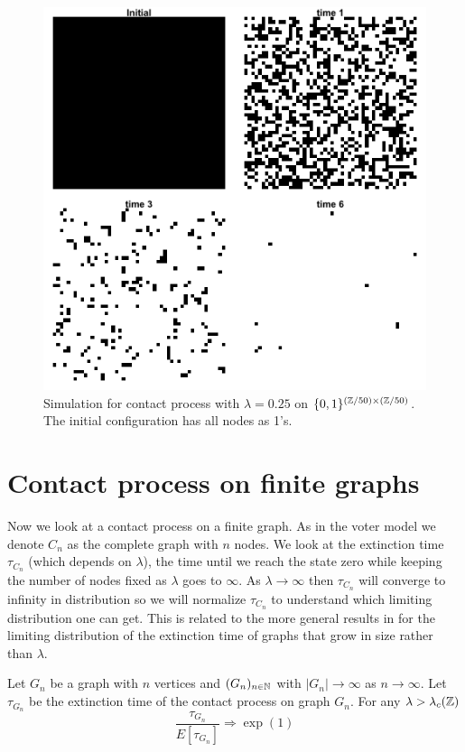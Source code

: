 \begin{figure}[H]
  \centering
    \includegraphics[width=.80\textwidth]{figures/contact_simulation_torus_25_below_crit.png}
   \caption{Simulation for contact process with $\lambda = 0.25$ on $\{0,1\}^{(\mathbb{Z}/50) \times (\mathbb{Z}/50)}$. The initial configuration has all nodes as 1's.}
  \label{fig:contact_sim_torus_below_crit.png}
\end{figure}

\section{Contact process on finite graphs}

Now we look at a contact process on a finite graph.
As in the voter model we denote $C_n$ as the complete graph with $n$ nodes.
We look at the extinction time $\tau_{C_n}$ (which depends on $\lambda$), the time until we reach the state zero while keeping the number of nodes fixed as $\lambda$ goes to $\infty$.
As $\lambda \to \infty$ then $\tau_{C_n}$ will converge to infinity in distribution so we will normalize $\tau_{C_n}$ to understand which limiting distribution one can get.
This is related to the more general results in \cite{schapira2017} for the limiting distribution of the extinction time of graphs that grow in size rather than $\lambda$.

\begin{theorem}
Let $G_n$ be a graph with $n$ vertices and $(G_n)_{n \in \mathbb{N}}$ with $|G_n| \to \infty$ as $n \to \infty$.
Let $\tau_{G_n}$ be the extinction time of the contact process on graph $G_n$.
For any $\lambda > \lambda_c(\mathbb{Z})$
$$
\frac{\tau_{G_n}}{E[\tau_{G_n}]} \Rightarrow \exp(1)
$$
\end{theorem}

